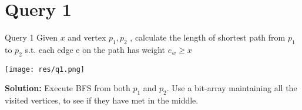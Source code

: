 
\section{Query 1}
\begin{frame}{Query 1}
Given $x$ and vertex $p_1 ,p_2$ , calculate the length of shortest path
from $p_1$ to $p_2$ s.t. each edge e on the path has weight $ e_w \ge x$

\begin{center}
  \texttt{[image: res/q1.png]}
\end{center}

\textbf{Solution:} Execute BFS from both $p_1$ and $p_2$.
Use a bit-array maintaining all the
visited vertices, to see if they have met
in the middle.

\end{frame}
